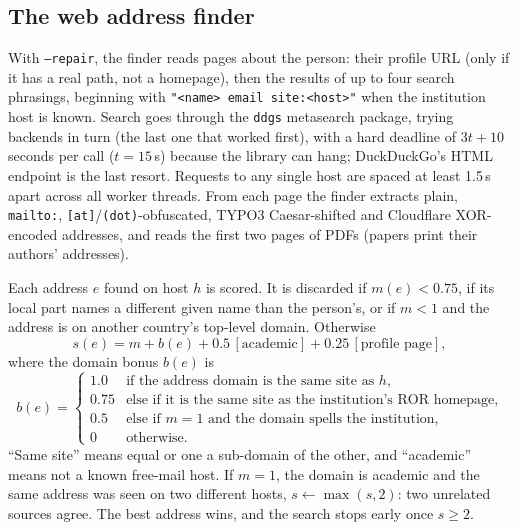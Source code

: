 \documentclass[11pt,a4paper]{article}
\newcommand{\code}[1]{\texttt{#1}}
\begin{document}
\subsection{The web address finder}
With \code{--repair}, the finder reads pages about the person: their profile URL (only if it has
a real path, not a homepage), then the results of up to four search phrasings, beginning with
\code{"<name> email site:<host>"} when the institution host is known. Search goes through the
\code{ddgs} metasearch package, trying backends in turn (the last one that worked first),
with a hard deadline of $3t + 10$ seconds per call ($t = 15$\,s) because the library can hang;
DuckDuckGo's HTML endpoint is the last resort. Requests to any single host are spaced at least
1.5\,s apart across all worker threads. From each page the finder extracts plain, \code{mailto:},
\code{[at]}/\code{(dot)}-obfuscated, TYPO3 Caesar-shifted and Cloudflare XOR-encoded addresses,
and reads the first two pages of PDFs (papers print their authors' addresses).

Each address $e$ found on host $h$ is scored. It is discarded if $m(e) < 0.75$, if its local part
names a different given name than the person's, or if $m < 1$ and the address is on another
country's top-level domain. Otherwise
\[
  s(e) = m + b(e) + 0.5\,[\text{academic}] + 0.25\,[\text{profile page}],
\]
where the domain bonus $b(e)$ is
\[
  b(e) = \begin{cases}
    1.0 & \text{if the address domain is the same site as } h,\\
    0.75 & \text{else if it is the same site as the institution's ROR homepage},\\
    0.5 & \text{else if } m = 1 \text{ and the domain spells the institution},\\
    0 & \text{otherwise.}
  \end{cases}
\]
``Same site'' means equal or one a sub-domain of the other, and ``academic'' means not a known
free-mail host. If $m = 1$, the domain is academic and the same address was seen on two different
hosts, $s \leftarrow \max(s, 2)$: two unrelated sources agree. The best address wins, and the
search stops early once $s \ge 2$.
\end{document}
